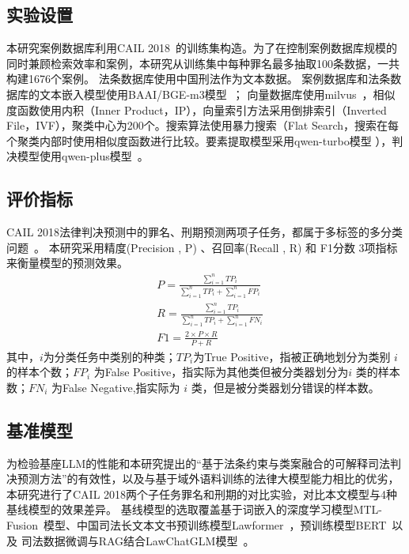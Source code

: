 \subsection{\heiti 实验设置}
本研究案例数据库利用CAIL 2018~\cite{xiao2018cail2018largescalelegaldataset}的训练集构造。为了在控制案例数据库规模的同时兼顾检索效率和案例，本研究从训练集中每种罪名最多抽取100条数据，一共构建1676个案例。
法条数据库使用中国刑法作为文本数据。
案例数据库和法条数据库的文本嵌入模型使用BAAI/BGE-m3模型~\cite{chenBGEM3EmbeddingMultiLingual2024}；
向量数据库使用milvus~\cite{2022manu,2021milvus}，相似度函数使用内积（Inner Product，IP），向量索引方法采用倒排索引（Inverted File，IVF），聚类中心为200个。搜索算法使用暴力搜索（Flat Search，搜索在每个聚类内部时使用相似度函数进行比较。要素提取模型采用qwen-turbo模型
），判决模型使用qwen-plus模型~\cite{qwenQwen25TechnicalReport2025}。

\subsection{\heiti 评价指标}
CAIL 2018法律判决预测中的罪名、刑期预测两项子任务，都属于多标签的多分类问题~\cite{xiao2018cail2018}。
本研究采用精度(Precision , P) 、召回率(Recall , R) 和 F1分数 3项指标来衡量模型的预测效果。
\begin{eqnarray}
		&P=\frac{\sum_{i=1}^{n}TP_{i}}{\sum_{i=1}^{n}TP_{i}+\sum_{i=1}^{n}FP_{i}}
		\\
		&R=\frac{\sum_{i=1}^{n}TP_{i}}{\sum_{i=1}^{n}TP_{i}+\sum_{i=1}^{n}FN_{i}}
		\\
		&F1=\frac{2\times P\times R}{P+R}
\end{eqnarray}
其中，$i$为分类任务中类别的种类；$TP_i$为True Positive，指被正确地划分为类别 $i$ 的样本个数；$FP_i$ 为False Positive，指实际为其他类但被分类器划分为$i$ 类的样本数；$FN_i$ 为False Negative,指实际为 $i$ 类，但是被分类器划分错误的样本数。


\subsection{\heiti 基准模型}
为检验基座LLM的性能和本研究提出的“基于法条约束与类案融合的可解释司法判决预测方法”的有效性，以及与基于域外语料训练的法律大模型能力相比的优劣，本研究进行了CAIL 2018两个子任务罪名和刑期的对比实验，对比本文模型与4种基线模型的效果差异。
基线模型的选取覆盖基于词嵌入的深度学习模型MTL-Fusion~\cite{zhuopeng-etal-2020-multi}模型、中国司法长文本文书预训练模型Lawformer~\cite{xiao2021lawformer}，预训练模型BERT~\cite{fan2022multi}以及 司法数据微调与RAG结合LawChatGLM模型~\cite{JSJA202505027}。

